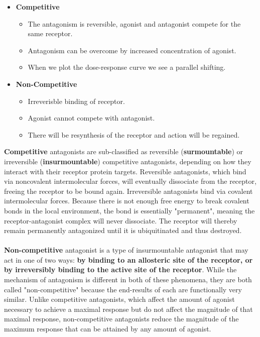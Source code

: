 \documentclass{book}
\begin{document}
\begin{itemize}
    \item \textbf{Competitive}
    \begin{itemize}
        \item The antagonism is reversible, agonist and antagonist compete for the same receptor.
        \item Antagonism can be overcome by increased concentration of agonist.
        \item When we plot the dose-response curve we see a parallel shifting.
    \end{itemize}

    \item \textbf{Non-Competitive}
    \begin{itemize}
        \item Irreverisble binding of receptor.
        \item Agonist cannot compete with antagonist.
        \item There will be resynthesis of the receptor and action will be regained.
    \end{itemize}
\end{itemize}
\textbf{Competitive} antagonists are sub-classified as reversible (\textbf{surmountable}) or irreversible (\textbf{insurmountable}) competitive antagonists, depending on how they interact with their receptor protein targets.
Reversible antagonists, which bind via noncovalent intermolecular forces, will eventually dissociate from the receptor, freeing the receptor to be bound again.
Irreversible antagonists bind via covalent intermolecular forces.
Because there is not enough free energy to break covalent bonds in the local environment, the bond is essentially "permanent", meaning the receptor-antagonist complex will never dissociate. 
The receptor will thereby remain permanently antagonized until it is ubiquitinated and thus destroyed.
\\
\\
\textbf{Non-competitive} antagonist is a type of insurmountable antagonist that may act in one of two ways: \textbf{by binding to an allosteric site of the receptor, or by irreversibly binding to the active site of the receptor}.
While the mechanism of antagonism is different in both of these phenomena, they are both called "non-competitive" because the end-results of each are functionally very similar. 
Unlike competitive antagonists, which affect the amount of agonist necessary to achieve a maximal response but do not affect the magnitude of that maximal response, non-competitive antagonists reduce the magnitude of the maximum response that can be attained by any amount of agonist.
\end{document}
